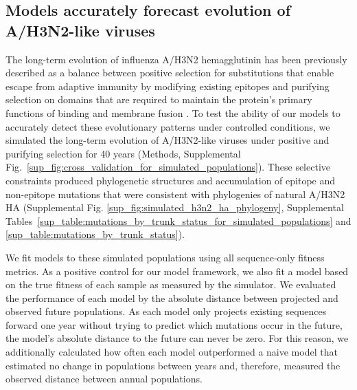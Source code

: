 \subsection*{Models accurately forecast evolution of A/H3N2-like viruses}

The long-term evolution of influenza A/H3N2 hemagglutinin has been previously described as a balance between positive selection for substitutions that enable escape from adaptive immunity by modifying existing epitopes and purifying selection on domains that are required to maintain the protein's primary functions of binding and membrane fusion \cite{Bush:1999vj,Neher2013,Luksza:2014hj,Koelle:2015dh}.
To test the ability of our models to accurately detect these evolutionary patterns under controlled conditions, we simulated the long-term evolution of A/H3N2-like viruses under positive and purifying selection for 40 years (Methods, Supplemental Fig.~\ref{sup_fig:cross_validation_for_simulated_populations}).
These selective constraints produced phylogenetic structures and accumulation of epitope and non-epitope mutations that were consistent with phylogenies of natural A/H3N2 HA (Supplemental Fig. \ref{sup_fig:simulated_h3n2_ha_phylogeny}, Supplemental Tables~\ref{sup_table:mutations_by_trunk_status_for_simulated_populations} and \ref{sup_table:mutations_by_trunk_status}).

We fit models to these simulated populations using all sequence-only fitness metrics.
As a positive control for our model framework, we also fit a model based on the true fitness of each sample as measured by the simulator.
We evaluated the performance of each model by the absolute distance between projected and observed future populations.
As each model only projects existing sequences forward one year without trying to predict which mutations occur in the future, the model's absolute distance to the future can never be zero.
For this reason, we additionally calculated how often each model outperformed a naive model that estimated no change in populations between years and, therefore, measured the observed distance between annual populations.

